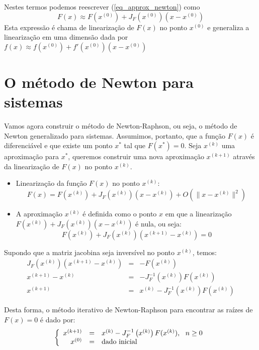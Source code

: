 \documentclass[main.tex]{subfiles}
\begin{document}
Nestes termos podemos reescrever (\ref{eq_approx_newton}) como
$$F(x)\approx F(x^{(0)}) + J_F(x^{(0)}) (x-x^{(0)})$$
Esta expressão é chama de linearização de $F(x)$ no ponto $x^{(0)}$ e generaliza a linearização em uma dimensão dada por $f(x)\approx f(x^{(0)})+f'(x^{(0)}) (x-x^{(0)})$



\section{O método de  Newton para sistemas}
Vamos agora construir o método de Newton-Raphson, ou seja, o método de Newton generalizado para sistemas. Assumimos, portanto, que a função $F(x)$ é diferenciável e que existe um ponto $x^*$ tal que $F(x^*)=0$. Seja $x^{(k)}$ uma aproximação para $x^*$, queremos construir uma nova aproximação $x^{(k+1)}$ através da linearização de $F(x)$ no ponto $x^{(k)}$.

\begin{itemize}
\item Linearização da função $F(x)$ no ponto $x^{(k)}$: 
  \begin{equation*}
F(x)= F(x^{(k)})+ J_F\left(x^{(k)}\right) \left(x-x^{(k)}\right)  + O\left(\|x-x^{(k)}\|^2\right)    
  \end{equation*}
\item A aproximação $x^{(k)}$ é definida como o ponto $x$ em que a linearização $F(x^{(k)})+ J_F\left(x^{(k)}\right) \left(x-x^{(k)}\right)$ é nula, ou seja:
$$F(x^{(k)})+ J_F\left(x^{(k)}\right) \left(x^{(k+1)}-x^{(k)}\right)=0$$
\end{itemize}

Supondo que a matriz jacobina seja inversível no ponto $x^{(k)}$, temos:
\begin{eqnarray*}
J_F\left(x^{(k)}\right) \left(x^{(k+1)}-x^{(k)}\right)&=&-F(x^{(k)})\\
x^{(k+1)}-x^{(k)}&=&-J_F^{-1}\left(x^{(k)}\right)F(x^{(k)})\\
x^{(k+1)}&=&x^{(k)}-J_F^{-1}\left(x^{(k)}\right)F(x^{(k)})
\end{eqnarray*}

Desta forma, o método iterativo de Newton-Raphson para encontrar as raízes de $F(x)=0$ é dado por:
\begin{equation*}
\left\{\begin{array}{rcl}
x^{(k+1)} &=& x^{(k)}-J_F^{-1}\left(x^{(k)}\right)F(x^{(k)}),~~ n\geq 0\\
x^{(0)}&=&\hbox{dado inicial}
\end{array}\right.  
\end{equation*}
\end{document}
